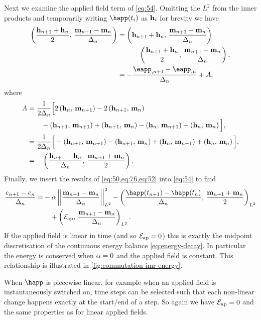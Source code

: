 Next we examine the applied field term of \cref{eq:54}.
Omitting the $L^2$ from the inner products and temporarily writing $\happ(t_i)$ as $\boldsymbol{\mathrm{h}}_i$ for brevity we have
\begin{equation}
  \begin{aligned}
    \ip{\frac{\hv_{n+1} + \hv_n}{2}}{\mpdmdt}
    &= \ip{\hv_{n+1} + \hv_n}{\mpdmdt} \\
    & \qquad - \ip{\frac{\hv_{n+1} + \hv_n}{2}}{\mpdmdt}, \\
    &= -\frac{\eapp_{, n+1} - \eapp_{, n}}{\dtn}  + A,
    \label{eq:76}
  \end{aligned}
\end{equation}
where
\begin{equation}
  \begin{aligned}
    A &= \frac{1}{2\Delta_{n}}\Big[ 2\left(\boldsymbol{\mathrm{h}}_n,\, \boldsymbol{\mathrm{m}}_{n+1} \right) - 2\left(\boldsymbol{\mathrm{h}}_{n+1},\, \boldsymbol{\mathrm{m}}_n \right) \\
    & \qquad - \left(\boldsymbol{\mathrm{h}}_{n+1},\, \boldsymbol{\mathrm{m}}_{n+1} \right) +\left(\boldsymbol{\mathrm{h}}_{n+1},\, \boldsymbol{\mathrm{m}}_n \right)
    - \left(\boldsymbol{\mathrm{h}}_n,\, \boldsymbol{\mathrm{m}}_{n+1} \right) + \left(\boldsymbol{\mathrm{h}}_n,\, \boldsymbol{\mathrm{m}}_n \right) \Big], \\
    &= \frac{1}{2\Delta_{n}}\Big[ - \left(\boldsymbol{\mathrm{h}}_{n+1},\, \boldsymbol{\mathrm{m}}_{n+1} \right) - \left(\boldsymbol{\mathrm{h}}_{n+1},\, \boldsymbol{\mathrm{m}}_n \right)
    + \left(\boldsymbol{\mathrm{h}}_n,\, \boldsymbol{\mathrm{m}}_{n+1} \right) + \left(\boldsymbol{\mathrm{h}}_n,\, \boldsymbol{\mathrm{m}}_n \right) \Big], \\
    &= - \left( \frac{\boldsymbol{\mathrm{h}}_{n+1} - \boldsymbol{\mathrm{h}}_n}{\Delta_{n}} ,\,  \frac{\boldsymbol{\mathrm{m}}_{n+1} + \boldsymbol{\mathrm{m}}_n}{2}  \right). \\
    \label{eq:52}
  \end{aligned}
\end{equation}
Finally, we insert the results of \cref{eq:50,eq:76,eq:52} into \cref{eq:54} to find
\begin{equation}
  \begin{aligned}
    \frac{\e_{n+1} - \e_n}{\dtn} = &-\dampc \ltnorm{\mpdmdt}^2
    - \ltip{\frac{\happ(t_{n+1}) -\happ(t_n)}{\dtn}}{\frac{\mv_{n+1} + \mv_{n}}{2}} \\
    &\quad+ \ltip{\happerror}{\mpdmdt}.
    \label{eqn:imr-llg-energy}
  \end{aligned}
\end{equation}
If the applied field is linear in time (and so $\mathcal{E}_\text{ap} = 0$) this is exactly the midpoint discretisation of the continuous energy balance \cref{eq:energy-decay}.
In particular the energy is conserved when $\alpha = 0$ and the applied field is constant.
This relationship is illustrated in \cref{fig:commutation-imr-energy}.

When $\happ$ is piecewise linear, for example when an applied field is instantaneously switched on, time steps can be selected such that each non-linear change happens exactly at the start/end of a step.
So again we have $\mathcal{E}_\text{ap} = 0$ and the same properties as for linear applied fields.


